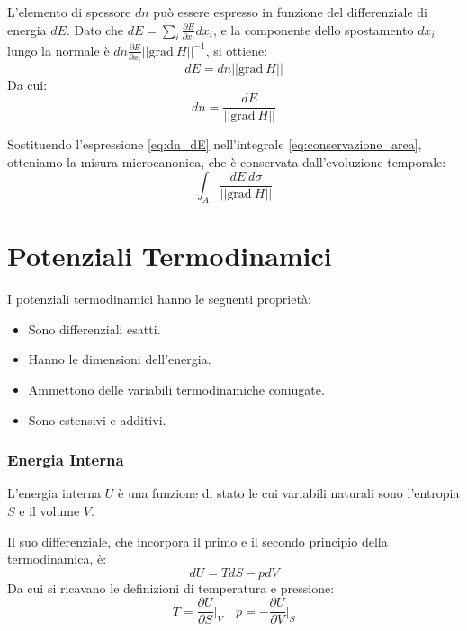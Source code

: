 L'elemento di spessore $dn$ può essere espresso in funzione del differenziale di energia $dE$. Dato che $dE = \sum_i \frac{\partial E}{\partial x_i} dx_i$, e la componente dello spostamento $dx_i$ lungo la normale è $dn \frac{\partial E}{\partial x_i} ||\text{grad}~H||^{-1}$, si ottiene:
\begin{equation}
    dE=dn||\text{grad}~H||
    \label{eq:dE_dn}
\end{equation}
Da cui:
\begin{equation}
    dn=\frac{dE}{||\text{grad}~H||}
    \label{eq:dn_dE}
\end{equation}

Sostituendo l'espressione \ref{eq:dn_dE} nell'integrale \ref{eq:conservazione_area}, otteniamo la misura microcanonica, che è conservata dall'evoluzione temporale:
\begin{equation}
    \int_{A}\frac{dE~d\sigma}{||\text{grad}~H||}
    \label{eq:misura_microcanonica}
\end{equation}

\section{Potenziali Termodinamici}

I potenziali termodinamici hanno le seguenti proprietà:
\begin{itemize}
    \item Sono differenziali esatti.
    \item Hanno le dimensioni dell'energia.
    \item Ammettono delle variabili termodinamiche coniugate.
    \item Sono estensivi e additivi.
\end{itemize}

\subsubsection{Energia Interna}

L'energia interna $U$ è una funzione di stato le cui variabili naturali sono l'entropia $S$ e il volume $V$.

Il suo differenziale, che incorpora il primo e il secondo principio della termodinamica, è:
\begin{equation}
    dU=TdS-pdV
    \label{eq:dU}
\end{equation}
Da cui si ricavano le definizioni di temperatura e pressione:
\begin{equation}
    T=\frac{\partial U}{\partial S}\bigg|_{V} \quad p=-\frac{\partial U}{\partial V}\bigg|_{S}
    \label{eq:def_T_p}
\end{equation}

